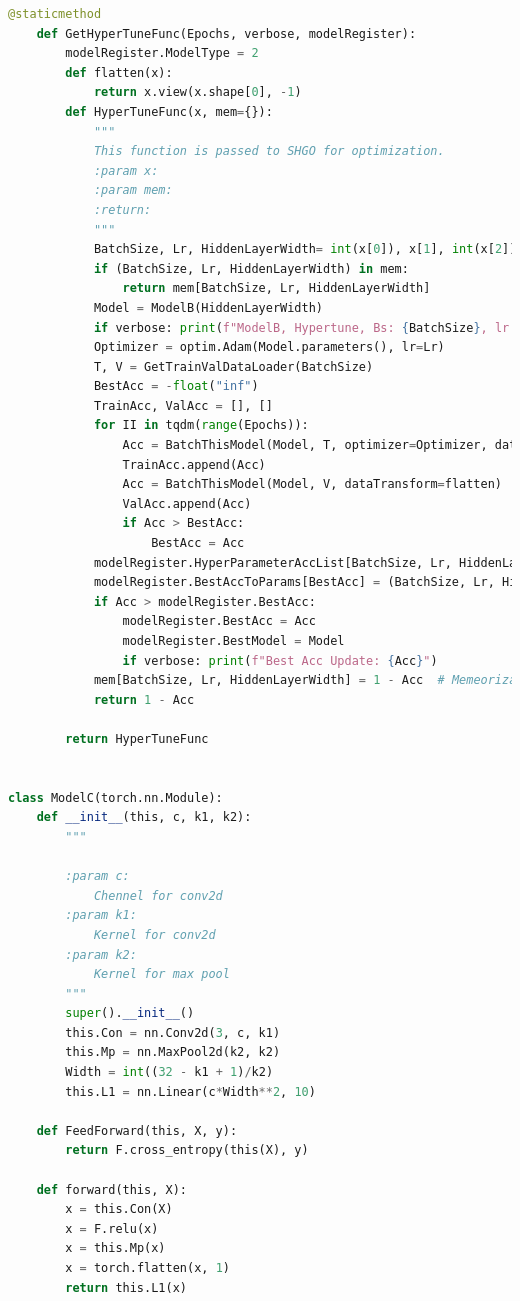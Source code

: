 \documentclass[]{article}
\begin{document}
\begin{lstlisting}[language=python]
    @staticmethod
    def GetHyperTuneFunc(Epochs, verbose, modelRegister):
        modelRegister.ModelType = 2
        def flatten(x):
            return x.view(x.shape[0], -1)
        def HyperTuneFunc(x, mem={}):
            """
            This function is passed to SHGO for optimization.
            :param x:
            :param mem:
            :return:
            """
            BatchSize, Lr, HiddenLayerWidth= int(x[0]), x[1], int(x[2])
            if (BatchSize, Lr, HiddenLayerWidth) in mem:
                return mem[BatchSize, Lr, HiddenLayerWidth]
            Model = ModelB(HiddenLayerWidth)
            if verbose: print(f"ModelB, Hypertune, Bs: {BatchSize}, lr: {Lr}, HLW: {HiddenLayerWidth}")
            Optimizer = optim.Adam(Model.parameters(), lr=Lr)
            T, V = GetTrainValDataLoader(BatchSize)
            BestAcc = -float("inf")
            TrainAcc, ValAcc = [], []
            for II in tqdm(range(Epochs)):
                Acc = BatchThisModel(Model, T, optimizer=Optimizer, dataTransform=flatten)
                TrainAcc.append(Acc)
                Acc = BatchThisModel(Model, V, dataTransform=flatten)
                ValAcc.append(Acc)
                if Acc > BestAcc:
                    BestAcc = Acc
            modelRegister.HyperParameterAccList[BatchSize, Lr, HiddenLayerWidth] = (TrainAcc, ValAcc)
            modelRegister.BestAccToParams[BestAcc] = (BatchSize, Lr, HiddenLayerWidth)
            if Acc > modelRegister.BestAcc:
                modelRegister.BestAcc = Acc
                modelRegister.BestModel = Model
                if verbose: print(f"Best Acc Update: {Acc}")
            mem[BatchSize, Lr, HiddenLayerWidth] = 1 - Acc  # Memeorization.
            return 1 - Acc

        return HyperTuneFunc


class ModelC(torch.nn.Module):
    def __init__(this, c, k1, k2):
        """

        :param c:
            Chennel for conv2d
        :param k1:
            Kernel for conv2d
        :param k2:
            Kernel for max pool
        """
        super().__init__()
        this.Con = nn.Conv2d(3, c, k1)
        this.Mp = nn.MaxPool2d(k2, k2)
        Width = int((32 - k1 + 1)/k2)
        this.L1 = nn.Linear(c*Width**2, 10)

    def FeedForward(this, X, y):
        return F.cross_entropy(this(X), y)

    def forward(this, X):
        x = this.Con(X)
        x = F.relu(x)
        x = this.Mp(x)
        x = torch.flatten(x, 1)
        return this.L1(x)


\end{lstlisting}
\end{document}
